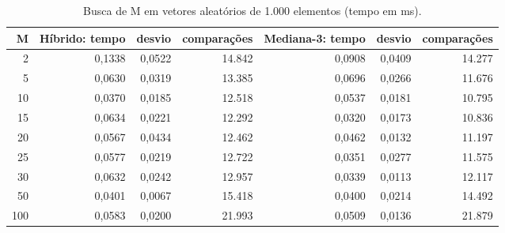 \begin{table}[htbp]
  \centering
  \small
  \setlength{\tabcolsep}{4pt}
  \caption{Busca de M em vetores aleatórios de 1.000 elementos (tempo em ms).}
  \label{tab:busca-m-n1000}
  \begin{tabular}{rrrrrrr}
    \toprule
    M & Híbrido: tempo & desvio & comparações & Mediana-3: tempo & desvio & comparações \\
    \midrule
    2 & 0,1338 & 0,0522 & 14.842 & 0,0908 & 0,0409 & 14.277 \\
    5 & 0,0630 & 0,0319 & 13.385 & 0,0696 & 0,0266 & 11.676 \\
    10 & 0,0370 & 0,0185 & 12.518 & 0,0537 & 0,0181 & 10.795 \\
    15 & 0,0634 & 0,0221 & 12.292 & 0,0320 & 0,0173 & 10.836 \\
    20 & 0,0567 & 0,0434 & 12.462 & 0,0462 & 0,0132 & 11.197 \\
    25 & 0,0577 & 0,0219 & 12.722 & 0,0351 & 0,0277 & 11.575 \\
    30 & 0,0632 & 0,0242 & 12.957 & 0,0339 & 0,0113 & 12.117 \\
    50 & 0,0401 & 0,0067 & 15.418 & 0,0400 & 0,0214 & 14.492 \\
    100 & 0,0583 & 0,0200 & 21.993 & 0,0509 & 0,0136 & 21.879 \\
    \bottomrule
  \end{tabular}
\end{table}
